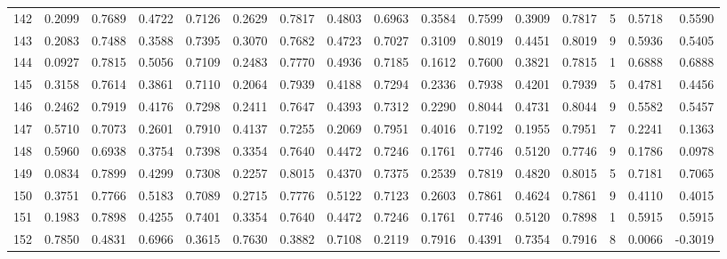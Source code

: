 \begin{tabular}{lrrrrrrrrrrrrrrr}
142 &      0.2099 &  0.7689 &  0.4722 &  0.7126 &  0.2629 &  0.7817 &  0.4803 &  0.6963 &  0.3584 &  0.7599 &   0.3909 &     0.7817 &      5 &                    0.5718 &                     0.5590 \\
143 &      0.2083 &  0.7488 &  0.3588 &  0.7395 &  0.3070 &  0.7682 &  0.4723 &  0.7027 &  0.3109 &  0.8019 &   0.4451 &     0.8019 &      9 &                    0.5936 &                     0.5405 \\
144 &      0.0927 &  0.7815 &  0.5056 &  0.7109 &  0.2483 &  0.7770 &  0.4936 &  0.7185 &  0.1612 &  0.7600 &   0.3821 &     0.7815 &      1 &                    0.6888 &                     0.6888 \\
145 &      0.3158 &  0.7614 &  0.3861 &  0.7110 &  0.2064 &  0.7939 &  0.4188 &  0.7294 &  0.2336 &  0.7938 &   0.4201 &     0.7939 &      5 &                    0.4781 &                     0.4456 \\
146 &      0.2462 &  0.7919 &  0.4176 &  0.7298 &  0.2411 &  0.7647 &  0.4393 &  0.7312 &  0.2290 &  0.8044 &   0.4731 &     0.8044 &      9 &                    0.5582 &                     0.5457 \\
147 &      0.5710 &  0.7073 &  0.2601 &  0.7910 &  0.4137 &  0.7255 &  0.2069 &  0.7951 &  0.4016 &  0.7192 &   0.1955 &     0.7951 &      7 &                    0.2241 &                     0.1363 \\
148 &      0.5960 &  0.6938 &  0.3754 &  0.7398 &  0.3354 &  0.7640 &  0.4472 &  0.7246 &  0.1761 &  0.7746 &   0.5120 &     0.7746 &      9 &                    0.1786 &                     0.0978 \\
149 &      0.0834 &  0.7899 &  0.4299 &  0.7308 &  0.2257 &  0.8015 &  0.4370 &  0.7375 &  0.2539 &  0.7819 &   0.4820 &     0.8015 &      5 &                    0.7181 &                     0.7065 \\
150 &      0.3751 &  0.7766 &  0.5183 &  0.7089 &  0.2715 &  0.7776 &  0.5122 &  0.7123 &  0.2603 &  0.7861 &   0.4624 &     0.7861 &      9 &                    0.4110 &                     0.4015 \\
151 &      0.1983 &  0.7898 &  0.4255 &  0.7401 &  0.3354 &  0.7640 &  0.4472 &  0.7246 &  0.1761 &  0.7746 &   0.5120 &     0.7898 &      1 &                    0.5915 &                     0.5915 \\
152 &      0.7850 &  0.4831 &  0.6966 &  0.3615 &  0.7630 &  0.3882 &  0.7108 &  0.2119 &  0.7916 &  0.4391 &   0.7354 &     0.7916 &      8 &                    0.0066 &                    -0.3019 \\

\end{tabular}
